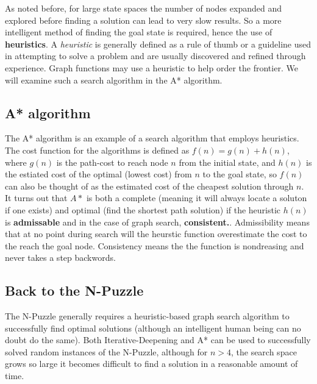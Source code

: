 \documentclass[a4, 12pt]{article}
\begin{document}
As noted before, for large state spaces the number of nodes expanded and explored before finding a solution can lead to very slow results. So a more intelligent method of finding the goal state is required, hence the use of \textbf{heuristics}. A \textit{heuristic} is generally defined as a rule of thumb or a guideline used in attempting to solve a problem and are usually discovered and refined through experience. Graph functions may use  a heuristic to help order the frontier. We will examine such a search algorithm in the A* algorithm.\\ 
\subsection{A* algorithm}

The A* algorithm is an example of a search algorithm that employs heuristics. The cost function for the algorithms is defined as $f(n) = g(n) + h(n)$, where $g(n)$ is the path-cost to reach node $n$ from the initial state, and $h(n)$ is the estiated cost of the optimal (lowest cost) from $n$ to the goal state, so $f(n)$ can also be thought of as the estimated cost of the cheapest solution through $n$. It turns out that $A*$ is both a complete (meaning it will always locate a soluton if one exists) and optimal (find the shortest path solution) if the heuristic $h(n)$ is \textbf{admissable} and in the case of graph search, \textbf{consistent.}. Admissibility means that at no point during search will the heurstic function overestimate the cost to the reach the goal node. Consistency means the the function is nondreasing and never takes a step backwords.  \\

\subsection{Back to the N-Puzzle}
The N-Puzzle generally requires a heuristic-based graph search algorithm to successfully find optimal solutions (although an intelligent human being can no doubt do the same). Both Iterative-Deepening and A* can be used to successfully solved random instances of the N-Puzzle, although for $n > 4$, the search space grows so large it becomes difficult to find a solution in a reasonable amount of time. \\ 
\end{document}
